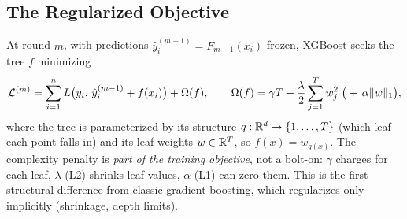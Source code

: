 \subsection{The Regularized Objective}

At round $m$, with predictions $\hat{y}_i^{(m-1)} = F_{m-1}(x_i)$ frozen, XGBoost seeks the tree $f$ minimizing
\begin{equation}
\mathcal{L}^{(m)} = \sum_{i=1}^{n} L\big(y_i,\, \hat{y}_i^{(m-1)} + f(x_i)\big) + \Omega(f), \qquad
\Omega(f) = \gamma T + \frac{\lambda}{2} \sum_{j=1}^{T} w_j^2 \;\big(+\, \alpha \|w\|_1\big),
\end{equation}
where the tree is parameterized by its structure $q: \mathbb{R}^d \to \{1, \ldots, T\}$ (which leaf each point falls in) and its leaf weights $w \in \mathbb{R}^T$, so $f(x) = w_{q(x)}$. The complexity penalty is \textit{part of the training objective}, not a bolt-on: $\gamma$ charges for each leaf, $\lambda$ (L2) shrinks leaf values, $\alpha$ (L1) can zero them. This is the first structural difference from classic gradient boosting, which regularizes only implicitly (shrinkage, depth limits).

